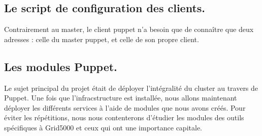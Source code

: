 \documentclass[a4paper,10pt]{article}
\begin{document}
		\subsection{Le script de configuration des clients.}
		Contrairement au master, le client puppet n'a besoin que de conna\^itre que deux adresses : celle du master puppet, et celle de son propre client. 
		\subsection{Les modules Puppet.}
		Le sujet principal du projet était de déployer l'intégralité du cluster au travers de Puppet. Une fois que l'infracstructure est installée, nous allons maintenant déployer les différents services à l'aide de modules que nous avons créés.	
		Pour éviter les répétitions, nous nous contenterons d'étudier les modules des outils spécifiques à Grid5000 et ceux qui ont une importance capitale.
\end{document}
